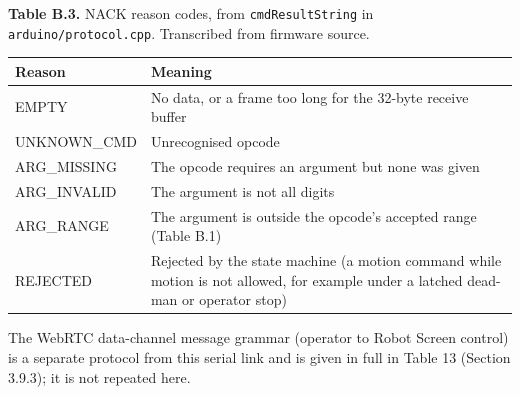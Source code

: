 \documentclass[12pt,a4paper]{report}
\begin{document}
\textbf{Table B.3.} NACK reason codes, from \texttt{cmdResultString} in \texttt{arduino/protocol.cpp}. Transcribed from firmware source.

\begin{center}
\begin{longtable}{|p{3.5cm}|p{9cm}|}
\hline
\textbf{Reason} & \textbf{Meaning} \\
\hline
\endhead
EMPTY & No data, or a frame too long for the 32-byte receive buffer \\
\hline
UNKNOWN\_CMD & Unrecognised opcode \\
\hline
ARG\_MISSING & The opcode requires an argument but none was given \\
\hline
ARG\_INVALID & The argument is not all digits \\
\hline
ARG\_RANGE & The argument is outside the opcode's accepted range (Table B.1) \\
\hline
REJECTED & Rejected by the state machine (a motion command while motion is not allowed, for example under a latched dead-man or operator stop) \\
\hline
\end{longtable}
\end{center}

The WebRTC data-channel message grammar (operator to Robot Screen control) is a separate protocol from this serial link and is given in full in Table 13 (Section 3.9.3); it is not repeated here.
\end{document}
